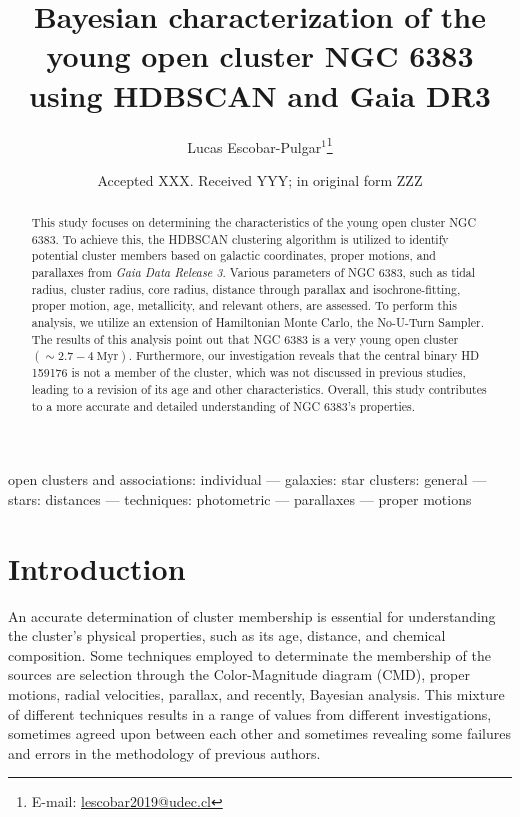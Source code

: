 \documentclass[fleqn,usenatbib,usedcolumn,useAMS]{mnras}
\title[Bayesian characterization of NGC 6383]{Bayesian characterization of the young open cluster NGC 6383 using HDBSCAN and Gaia DR3}
\author[Escobar-Pulgar]{Lucas Escobar-Pulgar\orcidlink{0009-0008-4359-2444}$^{1}$\thanks{E-mail: \href{mailito:lescobar2019@udec.cl}{lescobar2019@udec.cl}}}
\date{Accepted XXX. Received YYY; in original form ZZZ}
\begin{document}
\label{firstpage}
\pagerange{\pageref{firstpage}--\pageref{lastpage}}
\maketitle

\begin{abstract}
This study focuses on determining the characteristics of the young open cluster NGC 6383. To achieve this, the HDBSCAN clustering algorithm is utilized to identify potential cluster members based on galactic coordinates, proper motions, and parallaxes from {\sl Gaia Data Release 3}. Various parameters of NGC 6383, such as tidal radius, cluster radius, core radius, distance through parallax and isochrone-fitting, proper motion, age, metallicity, and relevant others, are assessed. To perform this analysis, we utilize an extension of Hamiltonian Monte Carlo, the No-U-Turn Sampler. The results of this analysis point out that NGC 6383 is a very young open cluster $(\sim 2.7 - 4~\mathrm{Myr})$. Furthermore, our investigation reveals that the central binary HD 159176 is not a member of the cluster, which was not discussed in previous studies, leading to a revision of its age and other characteristics. Overall, this study contributes to a more accurate and detailed understanding of NGC 6383's properties.
\end{abstract}

\begin{keywords}
open clusters and associations: individual — galaxies: star clusters: general — stars: distances — techniques: photometric — parallaxes — proper motions
\end{keywords}



\section{Introduction}

An accurate determination of cluster membership is essential for understanding the cluster's physical properties, such as its age, distance, and chemical composition. Some techniques employed to determinate the membership of the sources are selection through the Color-Magnitude diagram (CMD), proper motions, radial velocities, parallax, and recently, Bayesian analysis. This mixture of different techniques results in a range of values from different investigations, sometimes agreed upon between each other and sometimes revealing some failures and errors in the methodology of previous authors. \citep{1930LicOB..14..154T, 1937LicOB..18...89Z, 1949ApJ...110..117S, 2018A&A...610A..30A, 1978MNRAS.182..607F, 1989MNRAS.236..263P, 1991MNRAS.249...76B, 2005A&A...438.1163K, 2007A&A...462..157P, 1968ArA.....5....1L}
\end{document}
